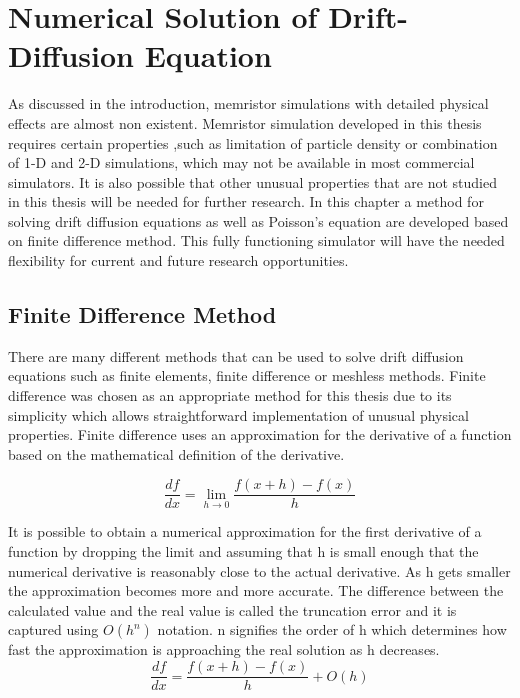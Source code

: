 

\chapter{Numerical Solution of Drift-Diffusion Equation} %

\label{Chapter3} %

\begin{doublespace}


As discussed in the introduction, memristor simulations with detailed physical effects are almost non existent. Memristor simulation developed in this thesis requires certain properties ,such as limitation of particle density or combination of 1-D and 2-D simulations, which may not be available in most commercial simulators. It is also possible that other unusual properties that are not studied in this thesis will be needed for further research. In this chapter a method for solving drift diffusion equations as well as Poisson's equation are developed based on finite difference method. This fully functioning simulator will have the needed flexibility for current and future research opportunities.  


\section{Finite Difference Method}
There are many different methods that can be used to solve drift diffusion equations such as finite elements, finite difference or meshless methods. Finite difference was chosen as an appropriate method for this thesis due to its simplicity which allows straightforward implementation of unusual physical properties. Finite difference uses an approximation for the derivative of a function based on the mathematical definition of the derivative\cite{numerical2}.

\begin{equation}
\frac{df}{dx}=\lim\limits_{h \rightarrow 0} \frac{f(x+h)-f(x)}{h}
\end{equation}

It is possible to obtain a numerical approximation for the first derivative of a function by dropping the limit and assuming that h is small enough that the numerical derivative is reasonably close to the actual derivative. As h gets smaller the approximation becomes more and more accurate. The difference between the calculated value and the real value is called the truncation error and it is captured using $O(h^n)$ notation. n signifies the order of h which determines how fast the approximation is approaching the real solution as h decreases.  
\begin{equation}
\frac{df}{dx}=\frac{f(x+h)-f(x)}{h} + O(h)
\label{numdif}
\end{equation}


\end{doublespace}
